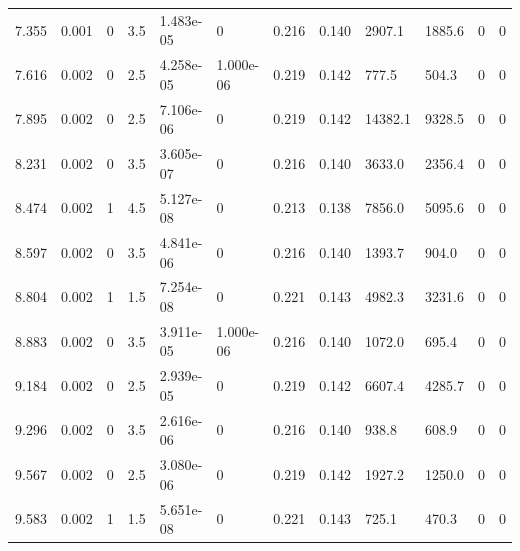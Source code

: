 \documentclass[preview]{standalone}
\begin{document}
{{\begin{tabular}{L{1.2cm}C{1.2cm} C{0.3cm}C{0.5cm} C{1.4cm}C{1.4cm} C{1.4cm}C{1.4cm} C{1.6cm}C{1.6cm} C{1.6cm}C{1.6cm}}
  7.355  &  0.001  & 0     & 3.5 &  1.483e-05  & 0  &  0.216&   0.140& 2907.1 & 1885.6   &  0 & 0  \\ 
  7.616  &  0.002  & 0     & 2.5 &  4.258e-05  & 1.000e-06  &  0.219&   0.142& 777.5 & 504.3   &  0 & 0  \\ 
  7.895  &  0.002  & 0     & 2.5 &  7.106e-06  & 0  &  0.219&   0.142& 14382.1 & 9328.5   &  0 & 0  \\ 
  8.231  &  0.002  & 0     & 3.5 &  3.605e-07  & 0  &  0.216&   0.140& 3633.0 & 2356.4   &  0 & 0  \\ 
  8.474  &  0.002  & 1     & 4.5 &  5.127e-08  & 0  &  0.213&   0.138& 7856.0 & 5095.6   &  0 & 0  \\ 
  8.597  &  0.002  & 0     & 3.5 &  4.841e-06  & 0  &  0.216&   0.140& 1393.7 & 904.0   &  0 & 0  \\ 
  8.804  &  0.002  & 1     & 1.5 &  7.254e-08  & 0  &  0.221&   0.143& 4982.3 & 3231.6   &  0 & 0  \\ 
  8.883  &  0.002  & 0     & 3.5 &  3.911e-05  & 1.000e-06  &  0.216&   0.140& 1072.0 & 695.4   &  0 & 0  \\ 
  9.184  &  0.002  & 0     & 2.5 &  2.939e-05  & 0  &  0.219&   0.142& 6607.4 & 4285.7   &  0 & 0  \\ 
  9.296  &  0.002  & 0     & 3.5 &  2.616e-06  & 0  &  0.216&   0.140& 938.8 & 608.9   &  0 & 0  \\ 
  9.567  &  0.002  & 0     & 2.5 &  3.080e-06  & 0  &  0.219&   0.142& 1927.2 & 1250.0   &  0 & 0  \\ 
  9.583  &  0.002  & 1     & 1.5 &  5.651e-08  & 0  &  0.221&   0.143& 725.1 & 470.3   &  0 & 0  \\ 
\hline 
\end{tabular} 

}}
\end{document}
